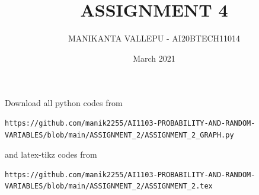 \documentclass[journal,12pt,twocolumn]{IEEEtran}
\date{March 2021}
\DeclareMathOperator*{\Res}{Res}
\begin{document}
\newcommand{\BEQA}{\begin{eqnarray}}
\newcommand{\EEQA}{\end{eqnarray}}
\newcommand{\define}{\stackrel{\triangle}{=}}

\raggedbottom
\setlength{\parindent}{0pt}
\providecommand{\mbf}{\mathbf}
\providecommand{\pr}[1]{\ensuremath{\Pr\left(#1\right)}}
\providecommand{\qfunc}[1]{\ensuremath{Q\left(#1\right)}}
\providecommand{\fn}[1]{\ensuremath{f\left(#1\right)}}
\providecommand{\e}[1]{\ensuremath{E\left(#1\right)}}
\providecommand{\sbrak}[1]{\ensuremath{{}\left[#1\right]}}
\providecommand{\lsbrak}[1]{\ensuremath{{}\left[#1\right.}}
\providecommand{\rsbrak}[1]{\ensuremath{{}\left.#1\right]}}
\providecommand{\brak}[1]{\ensuremath{\left(#1\right)}}
\providecommand{\lbrak}[1]{\ensuremath{\left(#1\right.}}
\providecommand{\rbrak}[1]{\ensuremath{\left.#1\right)}}
\providecommand{\cbrak}[1]{\ensuremath{\left\{#1\right\}}}
\providecommand{\lcbrak}[1]{\ensuremath{\left\{#1\right.}}
\providecommand{\rcbrak}[1]{\ensuremath{\left.#1\right\}}}
\theoremstyle{remark}
\newtheorem{rem}{Remark}
\newcommand{\sgn}{\mathop{\mathrm{sgn}}}
\providecommand{\abs}[1]{\vert#1\vert}
\providecommand{\res}[1]{\Res\displaylimits_{#1}} 
\providecommand{\norm}[1]{\lVert#1\rVert}
\providecommand{\mtx}[1]{\mathbf{#1}}
\providecommand{\mean}[1]{E[ #1 ]}
\providecommand{\fourier}{\overset{\mathcal{F}}{ \rightleftharpoons}}
\providecommand{\system}{\overset{\mathcal{H}}{ \longleftrightarrow}}
\newcommand{\solution}{\noindent \textbf{Solution: }}
\newcommand{\cosec}{\,\text{cosec}\,}
\providecommand{\dec}[2]{\ensuremath{\overset{#1}{\underset{#2}{\gtrless}}}}
\newcommand{\myvec}[1]{\ensuremath{\begin{pmatrix}#1\end{pmatrix}}}
\newcommand{\mydet}[1]{\ensuremath{\begin{vmatrix}#1\end{vmatrix}}}
\makeatletter
\vspace{3cm}
\title{ASSIGNMENT 4}
\author{MANIKANTA VALLEPU - AI20BTECH11014}
\maketitle
\newpage
\bigskip
\renewcommand{\thetable}{\theenumi}
Download all python codes from 
\begin{lstlisting}
https://github.com/manik2255/AI1103-PROBABILITY-AND-RANDOM-VARIABLES/blob/main/ASSIGNMENT_2/ASSIGNMENT_2_GRAPH.py
\end{lstlisting}
%
and latex-tikz codes from 
%
\begin{lstlisting}
https://github.com/manik2255/AI1103-PROBABILITY-AND-RANDOM-VARIABLES/blob/main/ASSIGNMENT_2/ASSIGNMENT_2.tex
\end{lstlisting}
\end{document}
